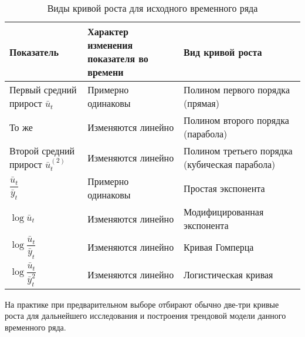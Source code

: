 \begin{table}[!h]
	\small
	\caption{Виды кривой роста для исходного временного ряда}
	\label{my-label}
	\setlength\extrarowheight{7pt}
	\begin{tabularx}{\textwidth}{|p{5.27cm}|K{5.2cm}|K{5.2cm}|}
			\hline
			Показатель                                                                                                                 & Характер изменения показателя во времени & Вид кривой роста                               \\ \hline
			Первый средний прирост $  \bar{u}_t $                                                                         & Примерно одинаковы                       & Полином первого порядка (прямая)               \\ \hline
			То же                                                                                                                      & Изменяются линейно                       & Полином второго порядка (парабола)             \\ \hline
			Второй средний прирост $ \bar{u}_t^{(2)} $                                                & Изменяются линейно                       & Полином третьего порядка (кубическая парабола) \\ \hline
			$ \dfrac{\bar{u}_t}{\bar{y}_t}  $                                       & Примерно одинаковы                       & Простая экспонента                             \\ \hline
			$ \log \bar{u}_t $                                                                            & Изменяются линейно                       & Модифицированная экспонента                    \\ \hline
			$ \log \dfrac{\bar{u}_t}{\bar{y}_t} $                    & Изменяются линейно                       & Кривая Гомперца                                \\ \hline
			$\log \dfrac{\bar{u}_t}{\bar{y}_t^2} $& Изменяются линейно                       & Логистическая кривая                           \\ \hline
		\end{tabularx}
\end{table}

На практике при предварительном выборе отбирают обычно две-три кривые роста для дальнейшего исследования и построения трендовой модели данного временного ряда.

